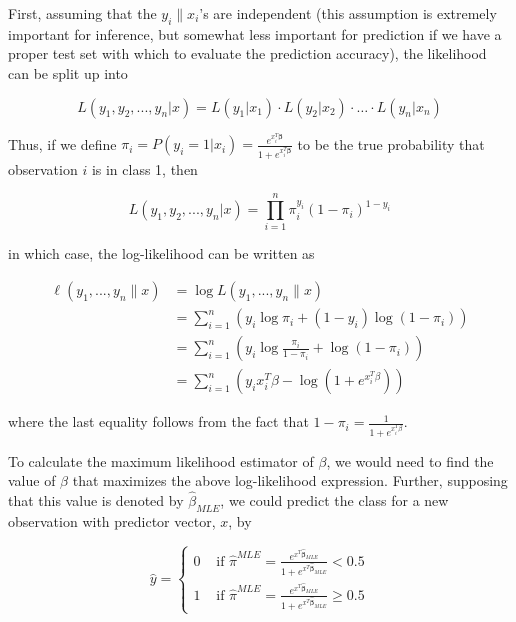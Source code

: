 First, assuming that the $y_i \| x_i$'s are independent (this assumption is extremely important for inference, but somewhat less important for prediction if we have a proper test set with which to evaluate the prediction accuracy), the likelihood can be split up into

$$L(y_1, y_2, ..., y_n | x) = L(y_1 | x_1) \cdot L(y_2 | x_2)  \cdot \dots \cdot L(y_n | x_n) $$

Thus, if we define $\pi_i = P(y_i = 1 | x_i) = \frac{e^{x_i^T \boldsymbol{\beta}} }{1 + e^{x_i^T \boldsymbol{\beta}}} $ to be the true probability that observation $i$ is in class 1, then 

$$L(y_1, y_2, ..., y_n | x) = \prod_{i=1}^n \pi_i^{y_i} ( 1 - \pi_i)^{1 - y_i} $$


in which case, the log-likelihood can be written as

\begin{align*}
\ell(y_1, ..., y_n \| x) & = \log L(y_1, ..., y_n \| x)\\
& = \sum_{i=1}^n \left( y_i \log \pi_i + ( 1- y_i) \log ( 1 - \pi_i)\right)\\
& = \sum_{i=1}^n \left( y_i \log \frac{\pi_i }{1- \pi_i} + \log (1 - \pi_i) \right)\\
& = \sum_{i=1}^n \left( y_i x_i^T \beta - \log \left( 1 + e^{x_i^T \beta} \right) \right) 
\end{align*}


where the last equality follows from the fact that $1 - \pi_i = \frac{1}{1 + e^{x_i^T \beta}}$.



To calculate the maximum likelihood estimator of $\beta$, we would need to find the value of $\beta$ that maximizes the above log-likelihood expression. Further, supposing that this value is denoted by $\hat{\beta}_{MLE}$, we could predict the class for a new observation with predictor vector, $x$, by

$$\hat{y} = \begin{cases} 0 & \text{ if } \hat{\pi}^{MLE} = \frac{e^{x^T \boldsymbol{\hat{\beta}}_{MLE}} }{1 + e^{x^T \boldsymbol{\hat{\beta}}_{MLE}}} < 0.5 \\ 
 1 & \text{ if } \hat{\pi}^{MLE} = \frac{e^{x^T \boldsymbol{\hat{\beta}}_{MLE}} }{1 + e^{x^T \boldsymbol{\hat{\beta}}_{MLE}}} \geq 0.5\end{cases}$$


